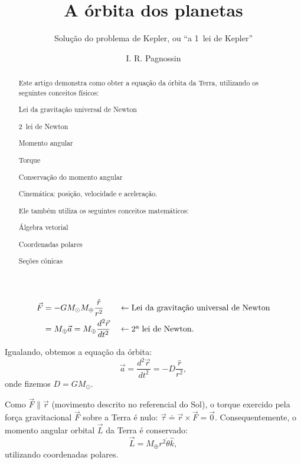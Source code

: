 \documentclass[a4paper, 12pt]{scrartcl}
\title{A órbita dos planetas}
\subtitle{Solução do problema de Kepler, ou ``a 1\textordfeminine~lei de Kepler''}
\author{I. R. Pagnossin}
\newcommand\earthmass{\ensuremath{M_{\oplus}}}
\newcommand\sunmass{\ensuremath{M_{\odot}}}
\begin{document}
	\maketitle

	\begin{abstract}
		Este artigo demonstra como obter a equação da órbita da Terra, utilizando os seguintes conceitos físicos:
		\begin{compactitem}
			\item Lei da gravitação universal de Newton
			\item 2\textordfeminine~lei de Newton
			\item Momento angular
			\item Torque
			\item Conservação do momento angular
			\item Cinemática: posição, velocidade e aceleração.
		\end{compactitem}

		Ele também utiliza os seguintes conceitos matemáticos:
		\begin{compactitem}
			\item Álgebra vetorial
			\item Coordenadas polares
			\item Seções cônicas
		\end{compactitem}
	\end{abstract}

	\begin{align*}
		\vec F &= - G \sunmass \earthmass \frac{\hat r}{r^2} &&\leftarrow\text{Lei da gravitação universal de Newton} \\
		       &= \earthmass \vec a = \earthmass \frac{d^2\vec r}{dt^2}         &&\leftarrow\text{2\textordfeminine~lei de Newton}.
	\end{align*}

	Igualando, obtemos a equação da órbita:
	\begin{equation}\label{eq:a}
		\vec a = \frac{d^2\vec r}{dt^2} = - D \frac{\hat r}{r^2},
	\end{equation}
	onde fizemos $D = G\sunmass$.

	Como $\vec F \parallel \vec r$ (movimento descrito no referencial do Sol), o torque exercido pela força gravitacional $\vec F$ sobre a Terra é nulo: $\vec \tau \doteq \vec r \times \vec F = \vec 0$.
	Consequentemente, o momento angular orbital $\vec L$ da Terra é conservado:
	\begin{equation}\label{eq:L}
		\vec L = \earthmass r^2 \dot\theta \hat k,
	\end{equation}
	utilizando coordenadas polares.
\end{document}
